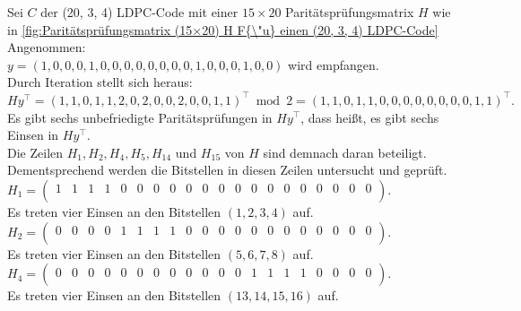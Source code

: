 \begin{Beispiel}
    Sei $C$ der (20, 3, 4) LDPC-Code mit einer $15 \times 20$ Paritätspr{\"u}fungsmatrix $H$ wie in \autoref{fig:Paritätsprüfungsmatrix (15×20) H F{\"u} einen (20, 3, 4) LDPC-Code}\\
    Angenommen:\\
    $y = (1,0,0,0,1,0,0,0,0,0,0,0,0,1,0,0,0,1,0,0)$ wird empfangen.\\
    
    Durch Iteration stellt sich heraus:\\
    $Hy^\intercal= (1,1,0,1,1,2,0,2,0,0,2,0,0,1,1)^\intercal \bmod 2= (1,1,0,1,1,0,0,0,0,0,0,0,0,1,1)^\intercal.$\\
    
    Es gibt sechs unbefriedigte Paritätsprüfungen in $Hy^\intercal$, dass hei\ss{}t, es gibt sechs Einsen in $Hy^\intercal.$\\
    Die Zeilen $H_1, H_2, H_4, H_5, H_{14}$ und $H_{15}$ von $H$ sind demnach daran beteiligt.\\ 
    Dementsprechend werden die Bitstellen in diesen Zeilen untersucht und geprüft.\\
    
    
    $H_1= \left( \begin{array}{rrrrrrrrrrrrrrrrrrrr}
        1 & 1 & 1 & 1 & 0 & 0 & 0 & 0 & 0 & 0 & 0 & 0 & 0 & 0 & 0 & 0 & 0 & 0 & 0 & 0 \\
       \end{array}\right). 
    $\\
    Es treten vier Einsen an den Bitstellen $(1, 2, 3, 4)$ auf.\\
    
    $H_2= \left( \begin{array}{rrrrrrrrrrrrrrrrrrrr}
        0 & 0 & 0 & 0 & 1 & 1 & 1 & 1 & 0 & 0 & 0 & 0 & 0 & 0 & 0 & 0 & 0 & 0 & 0 & 0 \\
       \end{array}\right). 
    $\\
    Es treten vier Einsen an den Bitstellen $(5, 6, 7, 8)$ auf.\\
    
    $H_4= \left( \begin{array}{rrrrrrrrrrrrrrrrrrrr}
        0 & 0 & 0 & 0 & 0 & 0 & 0 & 0 & 0 & 0 & 0 & 0 & 1 & 1 & 1 & 1 & 0 & 0 & 0 & 0 \\
       \end{array}\right). 
    $\\
    Es treten vier Einsen an den Bitstellen $(13, 14, 15, 16)$ auf.\\
    

\end{Beispiel}
